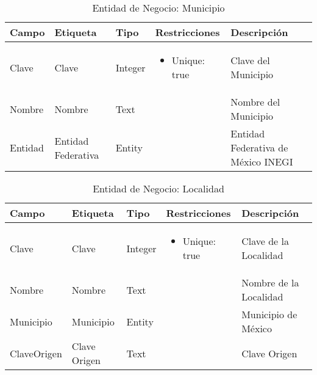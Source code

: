 \begin{table}[H]
	\caption{Entidad de Negocio: Municipio}
	\label{tab:fields-dom-Municipio}
	\begin{center}
	\begin{tabular}{ l l l l l }
		\hline
		\textbf{Campo} &
		\textbf{Etiqueta} &
		\textbf{Tipo} &
		\textbf{Restricciones} &
		\textbf{Descripción} \\
		\hline
		Clave &
		Clave &
		Integer &
		\begin{minipage}[t]{0.4\textwidth}
		\begin{itemize}[noitemsep,nolistsep]
		\setlength{\itemindent}{-.5cm}
		\item Unique: true
		\end{itemize}
		\end{minipage}
		 &
		Clave del Municipio \\
		Nombre &
		Nombre &
		Text &
		 &
		Nombre del Municipio \\
		Entidad &
		Entidad Federativa &
		Entity &
		 &
		Entidad Federativa de México INEGI \\
		\hline
	\end{tabular}
	\end{center}
\end{table}
\begin{table}[H]
	\caption{Entidad de Negocio: Localidad}
	\label{tab:fields-dom-Localidad}
	\begin{center}
	\begin{tabular}{ l l l l l }
		\hline
		\textbf{Campo} &
		\textbf{Etiqueta} &
		\textbf{Tipo} &
		\textbf{Restricciones} &
		\textbf{Descripción} \\
		\hline
		Clave &
		Clave &
		Integer &
		\begin{minipage}[t]{0.4\textwidth}
		\begin{itemize}[noitemsep,nolistsep]
		\setlength{\itemindent}{-.5cm}
		\item Unique: true
		\end{itemize}
		\end{minipage}
		 &
		Clave de la Localidad \\
		Nombre &
		Nombre &
		Text &
		 &
		Nombre de la Localidad \\
		Municipio &
		Municipio &
		Entity &
		 &
		Municipio de México \\
		ClaveOrigen &
		Clave Origen &
		Text &
		 &
		Clave Origen \\
		\hline
	\end{tabular}
	\end{center}
\end{table}

